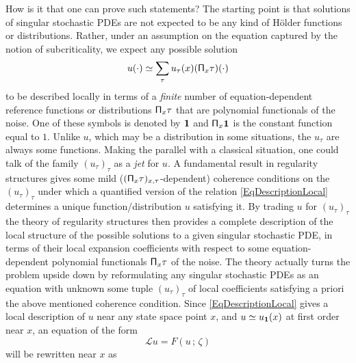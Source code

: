 \documentclass[10pt, reqno]{amsart}
\numberwithin{subsection}{section}
\numberwithin{subsubsection}{subsection}
\numberwithin{equation}{section} %
\theoremstyle{mystyle}
\theoremstyle{mystyle2}
\theoremstyle{mystyle3}
\begin{document}
How is it that one can prove such statements? The starting point is that solutions of singular stochastic PDEs are not expected to be any kind of H\"older functions or distributions. Rather, under an assumption on the equation captured by the notion of subcriticality, we expect any possible solution
\begin{equation} \label{EqDescriptionLocal}
u(\cdot) \simeq \sum_\tau u_\tau(x) ({\sf \Pi}_x\tau)(\cdot)
\end{equation}
to be described locally in terms of a {\it finite} number of equation-dependent reference functions or distributions ${\sf \Pi}_x\tau$ that are polynomial functionals of the noise. One of these symbols is denoted by $\bf 1$ and ${\sf \Pi}_x{\bf 1}$ is the constant function equal to $1$. Unlike $u$, which may be a distribution in some situations, the $u_\tau$ are always some functions. Making the parallel with a classical situation, one could talk of the family $(u_\tau)_\tau$ as a {\it jet} for $u$. A fundamental result in regularity structures gives some mild ($({\sf \Pi}_x\tau)_{x,\tau}$-dependent) coherence conditions on the $(u_\tau)_\tau$ under which a quantified version of the relation \eqref{EqDescriptionLocal} determines a unique function/distribution $u$ satisfying it. By trading $u$ for $(u_\tau)_\tau$ the theory of regularity structures then provides a complete description of the local structure of the possible solutions to a given singular stochastic PDE, in terms of their local expansion coefficients with respect to some equation-dependent polynomial functionals ${\sf \Pi}_x\tau$ of the noise. The theory actually turns the problem upside down by reformulating any singular stochastic PDEs as an equation with unknown some tuple $(u_\tau)_\tau$ of local coefficients satisfying a priori the above mentioned coherence condition. Since \eqref{EqDescriptionLocal} gives a local description of $u$ near any state space point $x$, and $u\simeq u_{\bf 1}(x)$ at first order near $x$, an equation of the form
$$
\mathcal{L}u = F(u\,;\,\zeta)
$$
will be rewritten near $x$ as
\end{document}
